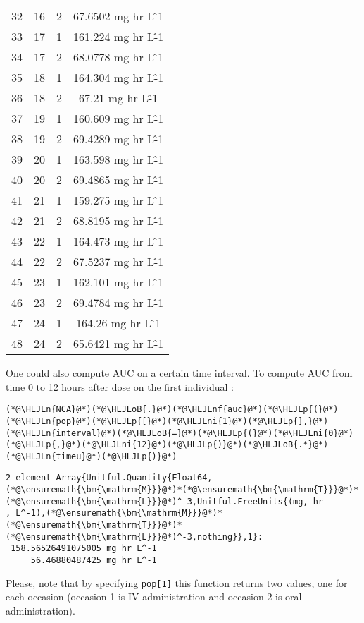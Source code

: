\documentclass[12pt,a4paper]{article}
\newcommand{\HLJLn}[1]{#1}
\newcommand{\HLJLnf}[1]{\textcolor[RGB]{66,102,213}{#1}}
\newcommand{\HLJLni}[1]{\textcolor[RGB]{59,151,46}{#1}}
\newcommand{\HLJLoB}[1]{\textcolor[RGB]{102,102,102}{\textbf{#1}}}
\newcommand{\HLJLp}[1]{#1}
\begin{document}
\begin{tabular}{r|ccc}
	32 & 16 & 2 & 67.6502 mg hr L\^-1 \\
	33 & 17 & 1 & 161.224 mg hr L\^-1 \\
	34 & 17 & 2 & 68.0778 mg hr L\^-1 \\
	35 & 18 & 1 & 164.304 mg hr L\^-1 \\
	36 & 18 & 2 & 67.21 mg hr L\^-1 \\
	37 & 19 & 1 & 160.609 mg hr L\^-1 \\
	38 & 19 & 2 & 69.4289 mg hr L\^-1 \\
	39 & 20 & 1 & 163.598 mg hr L\^-1 \\
	40 & 20 & 2 & 69.4865 mg hr L\^-1 \\
	41 & 21 & 1 & 159.275 mg hr L\^-1 \\
	42 & 21 & 2 & 68.8195 mg hr L\^-1 \\
	43 & 22 & 1 & 164.473 mg hr L\^-1 \\
	44 & 22 & 2 & 67.5237 mg hr L\^-1 \\
	45 & 23 & 1 & 162.101 mg hr L\^-1 \\
	46 & 23 & 2 & 69.4784 mg hr L\^-1 \\
	47 & 24 & 1 & 164.26 mg hr L\^-1 \\
	48 & 24 & 2 & 65.6421 mg hr L\^-1 \\
\end{tabular}


One could also compute AUC on a certain time interval. To compute AUC from time 0 to 12 hours after dose on the first individual :


\begin{lstlisting}
(*@\HLJLn{NCA}@*)(*@\HLJLoB{.}@*)(*@\HLJLnf{auc}@*)(*@\HLJLp{(}@*)(*@\HLJLn{pop}@*)(*@\HLJLp{[}@*)(*@\HLJLni{1}@*)(*@\HLJLp{],}@*) (*@\HLJLn{interval}@*)(*@\HLJLoB{=}@*)(*@\HLJLp{(}@*)(*@\HLJLni{0}@*)(*@\HLJLp{,}@*)(*@\HLJLni{12}@*)(*@\HLJLp{)}@*)(*@\HLJLoB{.*}@*)(*@\HLJLn{timeu}@*)(*@\HLJLp{)}@*)
\end{lstlisting}

\begin{lstlisting}
2-element Array{Unitful.Quantity{Float64,(*@\ensuremath{\bm{\mathrm{M}}}@*)*(*@\ensuremath{\bm{\mathrm{T}}}@*)*(*@\ensuremath{\bm{\mathrm{L}}}@*)^-3,Unitful.FreeUnits{(mg, hr
, L^-1),(*@\ensuremath{\bm{\mathrm{M}}}@*)*(*@\ensuremath{\bm{\mathrm{T}}}@*)*(*@\ensuremath{\bm{\mathrm{L}}}@*)^-3,nothing}},1}:
 158.56526491075005 mg hr L^-1
     56.46880487425 mg hr L^-1
\end{lstlisting}


Please, note that by specifying \texttt{pop[1]} this function returns two values, one for each occasion (occasion 1 is IV administration and occasion 2 is oral administration).
\end{document}
